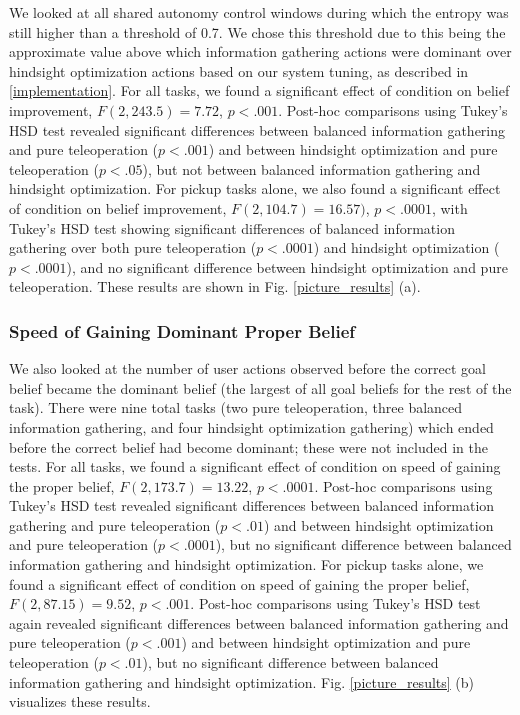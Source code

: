 \documentclass[conference]{IEEEtran}
\begin{document}
We looked at all shared autonomy control windows during which the entropy was still higher than a threshold of 0.7. We chose this threshold due to this being the approximate value above which information gathering actions were dominant over hindsight optimization actions based on our system tuning, as described in \ref{implementation}. For all tasks, we found a significant effect of condition on belief improvement, $F(2, 243.5) = 7.72$, $p < .001$. Post-hoc comparisons using Tukey's HSD test revealed significant differences between balanced information gathering and pure teleoperation ($p < .001$) and between hindsight optimization and pure teleoperation ($p < .05$), but not between balanced information gathering and hindsight optimization. For pickup tasks alone, we also found a significant effect of condition on belief improvement, $F(2, 104.7) = 16.57)$, $p < .0001$, with Tukey's HSD test showing significant differences of balanced information gathering over both pure teleoperation ($p < .0001$) and hindsight optimization ($p < .0001$), and no significant difference between hindsight optimization and pure teleoperation. These results are shown in Fig. \ref{picture_results} (a).

\subsubsection{Speed of Gaining Dominant Proper Belief}

We also looked at the number of user actions observed before the correct goal belief became the dominant belief (the largest of all goal beliefs for the rest of the task). There were nine total tasks (two pure teleoperation, three balanced information gathering, and four hindsight optimization gathering) which ended before the correct belief had become dominant; these were not included in the tests. For all tasks, we found a significant effect of condition on speed of gaining the proper belief, $F(2, 173.7) = 13.22$, $p < .0001$. Post-hoc comparisons using Tukey's HSD test revealed significant differences between balanced information gathering and pure teleoperation ($p < .01$) and between hindsight optimization and pure teleoperation ($p < .0001$), but no significant difference between balanced information gathering and hindsight optimization. For pickup tasks alone, we found a significant effect of condition on speed of gaining the proper belief, $F(2, 87.15) = 9.52$, $p < .001$. Post-hoc comparisons using Tukey's HSD test again revealed significant differences between balanced information gathering and pure teleoperation ($p < .001$) and between hindsight optimization and pure teleoperation ($p < .01$), but no significant difference between balanced information gathering and hindsight optimization. Fig. \ref{picture_results} (b) visualizes these results.
\end{document}
